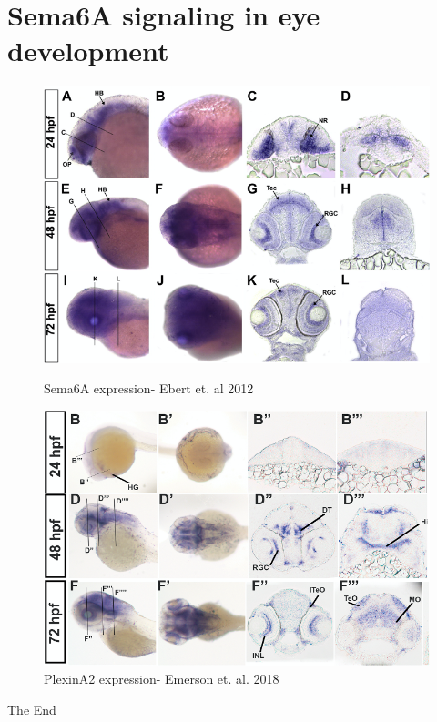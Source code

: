 \documentclass[12pt]{beamer}\usepackage[]{graphicx}\usepackage[]{color}
\begin{document}
\section{Sema6A signaling in eye development}
\begin{frame}

\begin{figure}
\begin{minipage}{.45\textwidth}
  \includegraphics[width=\linewidth]{S6Aexpression.png}
  \caption{Sema6A expression- Ebert et. al 2012}
\end{minipage}\hfill
\begin{minipage}{.45\textwidth}
  \includegraphics[width=\linewidth]{PlxnA2expression.png}
  \caption{PlexinA2 expression- Emerson et. al. 2018}
\end{minipage}
\end{figure}

\end{frame}

\begin{frame}
\Huge{\centerline{The End}}
\end{frame}

\end{document}
